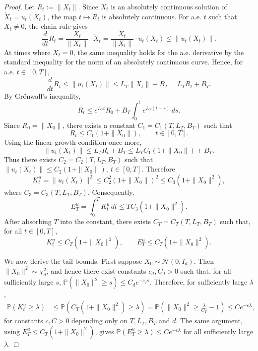 \documentclass[a4paper,11pt]{article}
\theoremstyle{plain}
\theoremstyle{definition}
\begin{document}
\begin{proof}
Let \(R_t:=\|X_t\|\). Since \(X_t\) is an absolutely continuous solution of
\(\dot X_t=u_t(X_t)\), the map \(t\mapsto R_t\) is absolutely continuous.
For a.e. \(t\) such that \(X_t\neq 0\), the chain rule gives
\[
    \frac{d}{dt}R_t
    =
    \frac{X_t}{\|X_t\|}\cdot \dot X_t
    =
    \frac{X_t}{\|X_t\|}\cdot u_t(X_t)
    \le
    \|u_t(X_t)\|.
\]
At times where \(X_t=0\), the same inequality holds for the a.e. derivative
by the standard inequality for the norm of an absolutely continuous curve.
Hence, for a.e. \(t\in[0,T]\),
\[
    \frac{d}{dt}R_t
    \le
    \|u_t(X_t)\|
    \le
    L_T\|X_t\|+B_T
    =
    L_T R_t+B_T.
\]
By Gr\"onwall's inequality,
\[
    R_t
    \le
    e^{L_Tt}R_0
    +
    B_T\int_0^t e^{L_T(t-s)}\,ds.
\]
Since \(R_0=\|X_0\|\), there exists a constant \(C_1=C_1(T,L_T,B_T)\) such that
\[
    R_t\le C_1(1+\|X_0\|),
    \qquad t\in[0,T].
\]
Using the linear-growth condition once more,
\[
    \|u_t(X_t)\|
    \le
    L_T R_t+B_T
    \le
    L_TC_1(1+\|X_0\|)+B_T.
\]
Thus there exists \(C_2=C_2(T,L_T,B_T)\) such that
\(
    \|u_t(X_t)\|
    \le
    C_2(1+\|X_0\|),
    \  t\in[0,T].
\)
Therefore
\[
    K_t^u
    =
    \|u_t(X_t)\|^2
    \le
    C_2^2(1+\|X_0\|)^2
    \le
    C_3(1+\|X_0\|^2),
\]
where \(C_3=C_3(T,L_T,B_T)\). Consequently,
\[
    E_T^u
    =
    \int_0^T K_t^u\,dt
    \le
    TC_3(1+\|X_0\|^2).
\]
After absorbing \(T\) into the constant, there exists
\(C_T=C_T(T,L_T,B_T)\) such that, for all \(t\in[0,T]\),
\[
    K_t^u\le C_T(1+\|X_0\|^2),
    \qquad
    E_T^u\le C_T(1+\|X_0\|^2).
\]

We now derive the tail bounds. First suppose \(X_0\sim\mathcal N(0,I_d)\).
Then \(\|X_0\|^2\sim\chi_d^2\), and hence there exist constants
\(c_d,C_d>0\) such that, for all sufficiently large \(s\),
\(\mathbb P(\|X_0\|^2\ge s)\le C_d e^{-c_d s}\). Therefore, for sufficiently
large \(\lambda\),
\[
\begin{aligned}
    \mathbb P(K_t^u\ge \lambda)
    &\le
    \mathbb P\left(C_T(1+\|X_0\|^2)\ge \lambda\right) =
    \mathbb P\left(\|X_0\|^2\ge \frac{\lambda}{C_T}-1\right) \le
    C e^{-c\lambda},
\end{aligned}
\]
for constants \(c,C>0\) depending only on \(T,L_T,B_T\) and \(d\). The same
argument, using \(E_T^u\le C_T(1+\|X_0\|^2)\), gives
\(\mathbb P(E_T^u\ge \lambda)\le C e^{-c\lambda}\) for all sufficiently large
\(\lambda\).


\end{proof}
\end{document}
